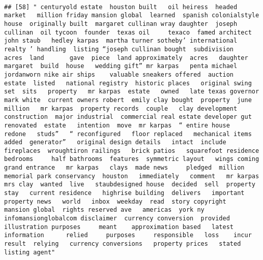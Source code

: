 \documentclass[
]{article}
\begin{document}
\begin{verbatim}
                                                                                                                                                                                                                                                                                                                                                                                                                                                                   
## [58] " centuryold estate  houston built   oil heiress  headed  market   million friday mansion global  learned  spanish colonialstyle house  originally built  margaret cullinan wray daughter  joseph cullinan  oil tycoon  founder  texas oil     texaco  famed architect john staub   hedley karpas  martha turner sotheby’ international realty ’ handling  listing “joseph cullinan bought  subdivision   acres  land       gave  piece  land approximately  acres   daughter margaret  build  house   wedding gift” mr karpas   penta michael jordanworn nike air ships    valuable sneakers offered  auction  estate  listed   national registry  historic places   original swing set  sits   property   mr karpas  estate   owned   late texas governor mark white  current owners robert  emily clay bought  property  june     million   mr karpas  property records  couple   clay development  construction  major industrial  commercial real estate developer gut renovated  estate   intention  move  mr karpas  “ entire house   redone   studs”   “ reconfigured   floor replaced   mechanical items  added  generator”   original design details   intact  include  fireplaces  wroughtiron railings   brick patios   squarefoot residence   bedrooms     half bathrooms  features  symmetric layout   wings coming   grand entrance   mr karpas   clays  made news     pledged  million   memorial park conservancy  houston   immediately   comment   mr karpas  mrs clay  wanted  live   staubdesigned house  decided  sell  property  stay   current residence   highrise building  delivers   important property news   world   inbox  weekday  read  story copyright   mansion global  rights reserved ave   americas  york ny    infomansionglobalcom disclaimer  currency conversion  provided  illustration purposes     meant    approximation based   latest information      relied     purposes     responsible   loss    incur   result  relying   currency conversions   property prices   stated   listing agent"                                                                                                                                                                                                                                                                                                                                                                                                                                                                                                                                                                                                                                                                                                                                                                                                                                                                                                                            
\end{verbatim}
\end{document}
